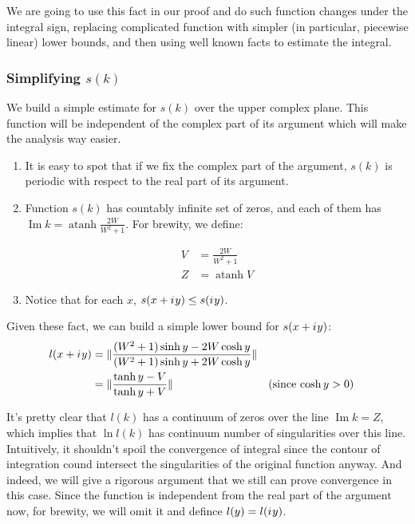\documentclass[12pt, a4paper]{article}
\theoremstyle{plain}
\newcommand{\iu}{{i\mkern1mu}}
\renewcommand{\Im}{\operatorname{Im}}
\DeclarePairedDelimiter\abs{\lvert}{\rvert}%
\DeclareMathOperator\atanh{atanh}
\begin{document}
We are going to use this fact in our proof and do such function changes under the integral sign, replacing complicated function with simpler (in particular, piecewise linear) lower bounds, and then using well known facts to estimate the integral.

\subsubsection{Simplifying $s(k)$}
We build a simple estimate for $s(k)$ over the upper complex plane. This function will be independent of the complex part of its argument which will make the analysis way easier.

\begin{enumerate}
\item
  It is easy to spot that if we fix the complex part of the argument, $s(k)$ is periodic with respect to the real part of its argument.
\item 
  Function $s(k)$ has countably infinite set of zeros, and each of them has $\Im k = \atanh \frac{2 W}{W^2 + 1}$. For brewity, we define:

  \begin{equation*}
  \begin{aligned}
     V &= \frac{2 W}{W^2 + 1}
  \\ Z &= \atanh V
  \end{aligned}
  \end{equation*}
\item
  Notice that for each $x$, $s(x + \iu y) \le s(\iu y)$.
\end{enumerate}

Given these fact, we can build a simple lower bound for $s(x + \iu y)$:
\begin{align*}
l(x + \iu y)
   &= \abs{\frac{(W^2 + 1) \sinh y - 2 W \cosh y}{(W^2 + 1) \sinh y + 2 W \cosh y}}
\\ &= \abs{\frac{\tanh y - V}{\tanh y + V}} && \text{(since $\cosh y > 0$)}
\end{align*}

It's pretty clear that $l(k)$ has a continuum of zeros over the line $\Im k = Z$, which implies that $\ln l(k)$ has continuum number of singularities over this line. Intuitively, it shouldn't spoil the convergence of integral since the contour of integration cound intersect the singularities of the original function anyway. And indeed, we will give a rigorous argument that we still can prove convergence in this case. Since the function is independent from the real part of the argument now, for brewity, we will omit it and defince $l(y) = l(\iu y)$.
\end{document}
